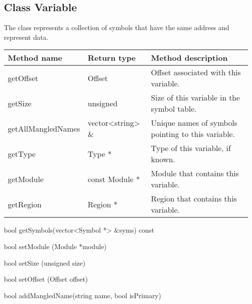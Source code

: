 \subsection{Class Variable}

The  class represents a collection of symbols that have the same address and represent data. 

\begin{tabular}{p{1.25in}p{1.125in}p{3.125in}}
\toprule
Method name & Return type & Method description \\
\midrule
getOffset & Offset & Offset associated with this variable. \\
getSize & unsigned & Size of this variable in the symbol table. \\
getAllMangledNames & vector<string> \& & Unique names of symbols pointing to this variable. \\
getType & Type * & Type of this variable, if known. \\
getModule & const Module * & Module that contains this variable. \\
getRegion & Region * & Region that contains this variable. \\
\bottomrule
\end{tabular}

\begin{apient}
bool getSymbols(vector<Symbol *> &syms) const
\end{apient}

\begin{apient}
bool setModule (Module *module)
\end{apient}

\begin{apient}
bool setSize (unsigned size)
\end{apient}

\begin{apient}
bool setOffset (Offset offset)
\end{apient}

\begin{apient}
bool addMangledName(string name,
                    bool isPrimary)
\end{apient}

